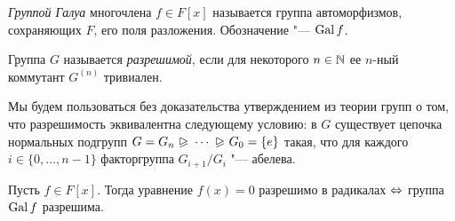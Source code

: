 \begin{definition}
	\textit{Группой Галуа} многочлена $f \in F[x]$ называется группа автоморфизмов, сохраняющих $F$, его поля разложения. Обозначение "--- $\operatorname{Gal}{f}$.
\end{definition}

\begin{definition}
	Группа $G$ называется \textit{разрешимой}, если для некоторого $n \in \mathbb{N}$ ее $n$-ный коммутант $G^{(n)}$ тривиален.
\end{definition}

\begin{note}
	Мы будем пользоваться без доказательства утверждением из теории групп о том, что разрешимость эквивалентна следующему условию: в $G$ существует цепочка нормальных подгрупп $G = G_n\varnormal\dotsb\varnormal G_0 = \{e\}$ такая, что для каждого $i \in \{0, \dotsc, n - 1\}$ факторгруппа $G_{i+1}/G_i$ "--- абелева.
\end{note}

\begin{theorem}
	Пусть $f \in F[x]$. Тогда уравнение $f(x) = 0$ разрешимо в радикалах $\Leftrightarrow$ группа $\operatorname{Gal}{f}$ разрешима.
\end{theorem}

